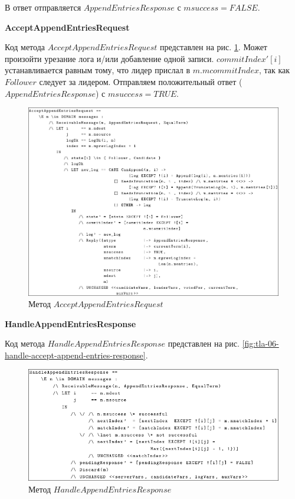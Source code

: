 В ответ отправляется $AppendEntriesResponse$ с $msuccess = FALSE$.

\textbf{AcceptAppendEntriesRequest}

Код метода $AcceptAppendEntriesRequest$ представлен на рис.
\ref{fig:tla-06-accept-append-entries}.
Может произойти урезание лога и/или добавление одной записи. $commitIndex'[i]$
устанавливается равным тому, что лидер прислал в $m.mcommitIndex$, так как
$Follower$ следует за лидером. Отправляем положительный ответ ($AppendEntriesResponse$)
с $msuccess = TRUE$.

\begin{figure}
  \centering
  \includegraphics[scale=0.4]{inc/tla-06-accept-append-entries.png}
  \caption{Метод $AcceptAppendEntriesRequest$}
  \label{fig:tla-06-accept-append-entries}
\end{figure}

\textbf{HandleAppendEntriesResponse}

Код метода $HandleAppendEntriesResponse$ представлен на рис.
\ref{fig:tla-06-handle-accept-append-entries-response}.

\begin{figure}
  \centering
  \includegraphics[scale=0.4]{inc/tla-06-handle-append-entries-response.png}
  \caption{Метод $HandleAppendEntriesResponse$}
  \label{fig:tla-06-handle-append-entries-response}
\end{figure}

